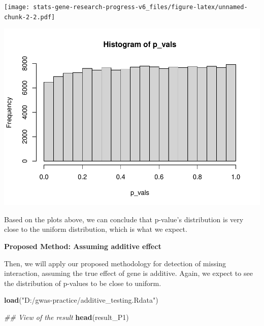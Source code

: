\documentclass[
]{article}
\newenvironment{Shaded}{\begin{snugshade}}{\end{snugshade}}
\newcommand{\CommentTok}[1]{\textcolor[rgb]{0.56,0.35,0.01}{\textit{#1}}}
\newcommand{\DataTypeTok}[1]{\textcolor[rgb]{0.13,0.29,0.53}{#1}}
\newcommand{\DecValTok}[1]{\textcolor[rgb]{0.00,0.00,0.81}{#1}}
\newcommand{\KeywordTok}[1]{\textcolor[rgb]{0.13,0.29,0.53}{\textbf{#1}}}
\newcommand{\NormalTok}[1]{#1}
\newcommand{\OperatorTok}[1]{\textcolor[rgb]{0.81,0.36,0.00}{\textbf{#1}}}
\newcommand{\StringTok}[1]{\textcolor[rgb]{0.31,0.60,0.02}{#1}}
\begin{document}
\texttt{[image: stats-gene-research-progress-v6\_files/figure-latex/unnamed-chunk-2-2.pdf]}

\begin{Shaded}
\end{Shaded}

\includegraphics{stats-gene-research-progress-v6_files/figure-latex/unnamed-chunk-2-3.pdf}

Based on the plots above, we can conclude that p-value's distribution is
very close to the uniform distribution, which is what we expect.

\clearpage

\textbf{Proposed Method: Assuming additive effect}

Then, we will apply our proposed methodology for detection of missing
interaction, assuming the true effect of gene is additive. Again, we
expect to see the distribution of p-values to be close to uniform.

\begin{Shaded}
\begin{Highlighting}[]
\KeywordTok{load}\NormalTok{(}\StringTok{"D:/gwas-practice/additive_testing.Rdata"}\NormalTok{)}

\CommentTok{## View of the result}
\KeywordTok{head}\NormalTok{(result_P1)}
\end{Highlighting}
\end{Shaded}
\end{document}
